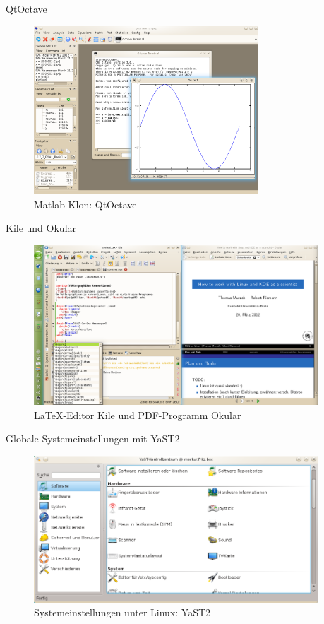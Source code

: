 \begin{frame}{QtOctave}
  \begin{figure}
    \includegraphics[keepaspectratio=true,width=0.75\textwidth]{qtoctave}
    \caption{Matlab Klon: QtOctave}
  \end{figure}
\end{frame}

\begin{frame}{Kile und Okular}
  \begin{figure}
    \includegraphics[keepaspectratio=true,width=0.95\textwidth]{kile}
    \caption{\LaTeX-Editor Kile und PDF-Programm Okular}
  \end{figure}
\end{frame}

\begin{frame}{Globale Systemeinstellungen mit YaST2}
  \begin{figure}
    \includegraphics[keepaspectratio=true,width=0.95\textwidth]{yast2}
    \caption{Systemeinstellungen unter Linux: YaST2}
  \end{figure}
\end{frame}

